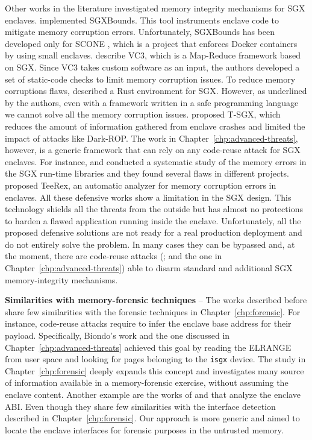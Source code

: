 Other works in the literature investigated memory integrity mechanisms for SGX 
enclaves. \cite{Kuvaiskii:2017:SMS:3064176.3064192} implemented SGXBounds.
This tool instruments enclave code to mitigate memory corruption errors.
Unfortunately, SGXBounds has been developed only for SCONE \citep{199364}, 
which is a project that enforces Docker containers by using small enclaves.
\cite{schuster2015vc3} describe VC3, which is a Map-Reduce framework based on 
SGX.
Since VC3 takes custom software as an input, the authors developed a set of 
static-code checks to limit memory corruption issues.
To reduce memory corruptions flaws, \cite{sgx-rust} described a Rust 
environment for SGX. 
However, as underlined by the authors, even with a framework written in a safe 
programming language we cannot solve all the memory corruption issues.
\cite{il3} proposed T-SGX, which reduces the amount of information gathered 
from enclave crashes and limited the impact of attacks like Dark-ROP.
The work in Chapter~\ref{chp:advanced-threats}, however, is a generic framework 
that can rely on any code-reuse attack for SGX enclaves.
For instance, \cite{tale-two-worlds} and \cite{sgxfloating} conducted a 
systematic study of the memory errors in the SGX run-time libraries and they 
found several flaws in different projects.
\cite{teerex} proposed TeeRex, an automatic analyzer for memory corruption 
errors in enclaves.
All these defensive works show a limitation in the SGX design. This technology 
shields all the threats from the outside but has almost no protections to 
harden a flawed application running inside the enclave. 
Unfortunately, all the proposed defensive solutions are not ready for a real 
production deployment and do not entirely solve the problem.
In many cases they can be bypassed and, at the moment,
there are code-reuse attacks (\cite{biondo2018guard,lee2017hacking}; and the 
one in Chapter~\ref{chp:advanced-threats}) able to 
disarm standard and additional SGX memory-integrity mechanisms.

\vspace{0.5cm}
\noindent \textbf{Similarities with memory-forensic techniques} -- The works 
described before share few similarities with the forensic techniques 
in Chapter~\ref{chp:forensic}.
For instance, code-reuse attacks require to infer the enclave base address for 
their payload.
Specifically, Biondo's work and the one discussed in 
Chapter~\ref{chp:advanced-threats} achieved this goal by reading the ELRANGE 
from user space and looking for pages belonging to the \texttt{isgx} device.
The study in Chapter~\ref{chp:forensic} deeply expands this concept and 
investigates many source of information available in a memory-forensic 
exercise, without assuming the enclave content. 
%
Another example are the works of \cite{tale-two-worlds} and \cite{sgxfloating} 
that analyze the enclave ABI.
Even though they share few similarities with the interface detection described 
in Chapter~\ref{chp:forensic}. Our approach is more generic and aimed to locate 
the enclave interfaces for forensic purposes in the untrusted memory. 

